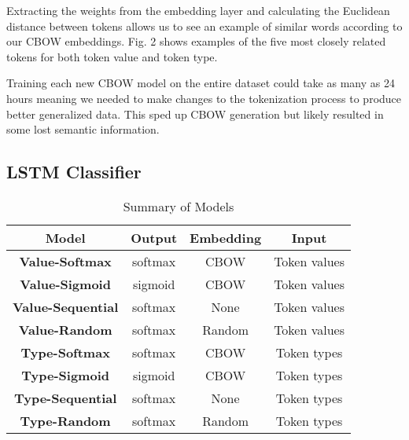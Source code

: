 Extracting the weights from the embedding layer and calculating the Euclidean distance between tokens allows us to see an example of similar words according to our CBOW embeddings.  Fig. 2 shows examples of the five most closely related tokens for both token value and token type.

Training each new CBOW model on the entire dataset could take as many as 24 hours meaning we needed to make changes to the tokenization process to produce better generalized data.  This sped up CBOW generation but likely resulted in some lost semantic information.


\subsection{LSTM Classifier}

\begin{table}
\begin{center}
\begingroup
\setlength{\tabcolsep}{6pt} %
\renewcommand{\arraystretch}{1.5} %
\begin{tabular}{|| c | c | c | c ||} 
    \hline
    Model & Output & Embedding & Input \\ 
    \hline\hline
    \textbf{Value-Softmax} & softmax & CBOW & Token values \\
    \hline
    \textbf{Value-Sigmoid} &  sigmoid & CBOW & Token values \\ 
    \hline
    \textbf{Value-Sequential} & softmax & None & Token values \\
    \hline
    \textbf{Value-Random} & softmax & Random & Token values \\
    \hline
    \textbf{Type-Softmax} & softmax & CBOW & Token types \\
    \hline
    \textbf{Type-Sigmoid} & sigmoid & CBOW & Token types \\
    \hline
    \textbf{Type-Sequential} & softmax & None & Token types \\
    \hline
    \textbf{Type-Random} & softmax & Random & Token types \\
    \hline
\end{tabular}
\endgroup
\caption{\label{model-sum}Summary of Models}
\end{center}
\end{table}
